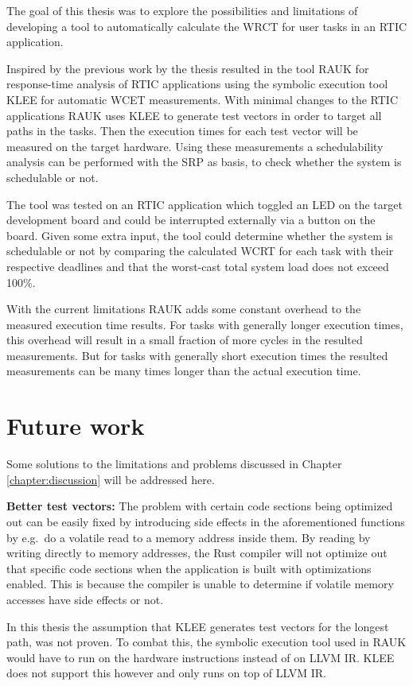 The goal of this thesis was to explore the possibilities and limitations of
developing a tool to automatically calculate the WRCT for user tasks in an
RTIC application.

Inspired by the previous work by \cite{lindner} the thesis resulted in the tool
RAUK for response-time analysis of RTIC applications using the symbolic
execution tool KLEE for automatic WCET measurements. With minimal changes to
the RTIC applications RAUK uses KLEE to generate test vectors in order to
target all paths in the tasks. Then the execution times for each test vector
will be measured on the target hardware. Using these measurements a
schedulability analysis can be performed with the SRP as basis, to check
whether the system is schedulable or not.

The tool was tested on an RTIC application which toggled an LED on the
target development board and could be interrupted externally via a button
on the board. Given some extra input, the tool could determine whether
the system is schedulable or not by comparing the calculated WCRT for
each task with their respective deadlines and that the worst-cast total
system load does not exceed 100\%.

With the current limitations RAUK adds some constant overhead to the measured
execution time results. For tasks with generally longer execution times, this
overhead will result in a small fraction of more cycles in the resulted
measurements. But for tasks with generally short execution times the resulted
measurements can be many times longer than the actual execution time.

\section{Future work}
Some solutions to the limitations and problems discussed in Chapter
\ref{chapter:discussion} will be addressed here.

\textbf{Better test vectors:} The problem with certain code sections being
optimized out can be easily fixed by introducing side effects in the
aforementioned functions by e.g.\ do a volatile read to a memory address inside
them. By reading by writing directly to memory addresses, the Rust compiler
will not optimize out that specific code sections when the application is built
with optimizations enabled. This is because the compiler is unable to determine
if volatile memory accesses have side effects or not.

In this thesis the assumption that KLEE generates test vectors for the longest
path, was not proven. To combat this, the symbolic execution tool used in RAUK
would have to run on the hardware instructions instead of on LLVM IR. KLEE does
not support this however and only runs on top of LLVM IR.

